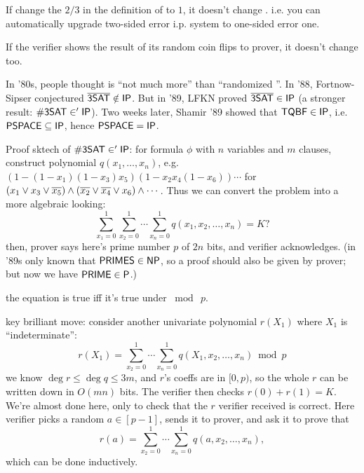 \documentclass{article}
\begin{document}
\begin{theorem}
  If change the \(2/3\) in the definition of \IP to \(1\), it doesn't change \IP. i.e. you can automatically upgrade two-sided error i.p. system to one-sided error one.
\end{theorem}

\begin{fact}
  If the verifier shows the result of its random coin flips to prover, it doesn't change \IP too.
\end{fact}

In '80s, people thought \IP is ``not much more'' than ``randomized \NP''.
In '88, Fortnow-Sipser conjectured \(\overline{\text{\sf 3SAT}} \notin \text{\sf IP}\).
But in '89, LFKN proved \(\overline{\text{\sf 3SAT}} \in \text{\sf IP}\) (a stronger result: \(\text{\sf \#3SAT} \in '\text{\sf IP}\)).
Two weeks later, Shamir '89 showed that \(\text{\sf TQBF} \in \text{\sf IP}\), i.e. \(\text{\sf PSPACE} \subseteq \text{\sf IP}\), hence \(\text{\sf PSPACE} = \text{\sf IP}\).

Proof sktech of \(\text{\sf \#3SAT} \in '\text{\sf IP}\):
for formula \(\phi\) with \(n\) variables and \(m\) clauses, construct polynomial \(q(x_1, \ldots, x_n)\), e.g. \((1 - (1 - x_1)(1 - x_3)x_5) (1 - x_2 x_4 (1 - x_6)) \cdots\) for \((x_1 \vee x_3 \vee \overline{x_5}) \wedge (\overline{x_2} \vee \overline{x_4} \vee x_6) \wedge \cdots\).
Thus we can convert the problem into a more algebraic looking:
\[ \sum_{x_1 = 0}^1 \sum_{x_2 = 0}^1 \cdots \sum_{x_n = 0}^1 q(x_1, x_2, \ldots, x_n) = K ? \]
then, prover says here's prime number \(p\) of \(2n\) bits, and verifier acknowledges. (in '89s only known that \(\text{\sf PRIMES} \in \text{\sf NP}\), so a proof should also be given by prover; but now we have \(\text{\sf PRIME} \in \text{\sf P}\).)

\begin{fact}
  the equation is true iff it's true under \(\bmod\ p\).
\end{fact}

key brilliant move: consider another univariate polynomial \(r(X_1)\) where \(X_1\) is ``indeterminate'':
\[ r(X_1) = \sum_{x_2 = 0}^1 \cdots \sum_{x_n = 0}^1 q(X_1, x_2, \ldots, x_n) \bmod{p}\]
we know \(\deg{r} \leq \deg{q} \leq 3m\), and \(r\)'s coeffs are in \([0, p)\), so the whole \(r\) can be written down in \(O(mn)\) bits.
The verifier then checks \(r(0) + r(1) = K\).
We're almost done here, only to check that the \(r\) verifier received is correct.
Here verifier picks a random \(a \in [p-1]\), sends it to prover, and ask it to prove that
\[ r(a) = \sum_{x_2 = 0}^1 \cdots \sum_{x_n = 0}^1 q(a, x_2, \ldots, x_n), \]
which can be done inductively.
\end{document}
